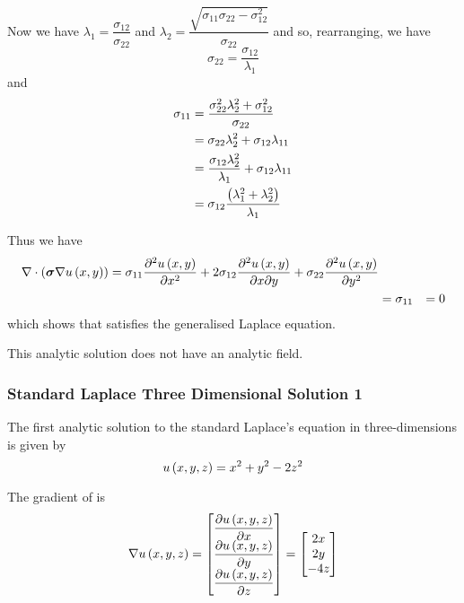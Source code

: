 Now we have $\lambda_{1}=\dfrac{\sigma_{12}}{\sigma_{22}}$ and
$\lambda_{2}=\dfrac{\sqrt{\sigma_{11}\sigma_{22}-\sigma_{12}^{2}}}{\sigma_{22}}$
and so, rearranging, we have
\begin{equation}
  \sigma_{22}=\dfrac{\sigma_{12}}{\lambda_{1}}
\end{equation}
and
\begin{equation}
  \begin{aligned}
    \sigma_{11}&=\dfrac{\sigma_{22}^{2}\lambda_{2}^{2}+\sigma_{12}^{2}}{\sigma_{22}}\\
    &=\sigma_{22}\lambda_{2}^{2}+\sigma_{12}\lambda_{11}\\
    &=\dfrac{\sigma_{12}\lambda_{2}^{2}}{\lambda_{1}}+\sigma_{12}\lambda_{11}\\
    &=\sigma_{12}\dfrac{\left( \lambda_{1}^{2}+\lambda_{2}^{2} \right)}{\lambda_{1}}
  \end{aligned}
\end{equation}

Thus we have
\begin{equation}
  \begin{aligned}
    \divergence{}{\pbrac{\tensor{\sigma}\gradient{}\fnof{u}{x,y}}}=\sigma_{11}\deltwosqby{\fnof{u}{x,y}}{x}+
    2\sigma_{12}\deltwoby{\fnof{u}{x,y}}{x}{y}+\sigma_{22}\deltwosqby{\fnof{u}{x,y}}{y}\\
  &=\sigma_{11}
  &=0
  \end{aligned}
\end{equation}
which shows that  satisfies the generalised Laplace equation.

This analytic solution does not have an analytic field.

\subsubsection{Standard Laplace Three Dimensional Solution 1}

The first analytic solution to the standard Laplace's equation in three-dimensions is given by
\begin{equation}
  \fnof{u}{x,y,z}=x^{2}+y^{2}-2z^{2}
  \label{eqn:StandardLaplaceThreeDAnalytic1}
\end{equation}

The gradient of  is
\begin{equation}
  \gradient{}{\fnof{u}{x,y,z}}=\begin{bmatrix}
  \delby{\fnof{u}{x,y,z}}{x} \\
  \delby{\fnof{u}{x,y,z}}{y} \\
  \delby{\fnof{u}{x,y,z}}{z}
  \end{bmatrix}=\begin{bmatrix}
  2x \\
  2y \\
  -4z
  \end{bmatrix}
  \label{eqn:StandardLaplaceThreeDAnalyticGradient1}
\end{equation}

